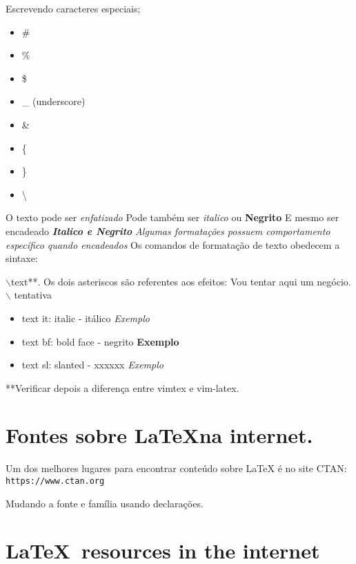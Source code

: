 \documentclass[a4paper, 12pt]{article}
\begin{document}
Escrevendo caracteres especiais;
\begin{itemize}
        \item \#
        \item \%
        \item \$
        \item \_ (underscore)
        \item \&
        \item \{
        \item \}
        \item \textbackslash

\end{itemize}

O texto pode ser \emph{enfatizado}
Pode também ser \textit{italico} ou \textbf{Negrito}
E mesmo ser encadeado \textbf{\textit{Italico e Negrito}}
\emph{Algumas formatações possuem \emph{comportamento específico} quando encadeados}
Os comandos de formatação de texto obedecem a sintaxe: 

$\backslash$text**. Os dois asteriscos são referentes aos efeitos:
Vou tentar aqui um negócio. $\backslash$ tentativa

\begin{itemize}
    \item{text it: italic - itálico}
        \textit{Exemplo}
    \item{text bf: bold face - negrito}
        \textbf{Exemplo}
    \item{text sl: slanted - xxxxxx}
        \textsl{Exemplo}
\end{itemize}

**Verificar depois a diferença entre vimtex e vim-latex.

\section{\textsf{Fontes sobre \LaTeX na internet.}}

Um dos melhores lugares para encontrar conteúdo sobre LaTeX é no site CTAN:
\texttt{https://www.ctan.org}



Mudando a fonte e família usando declarações.

\section{\sffamily\LaTeX\ resources in the internet}
\end{document}
